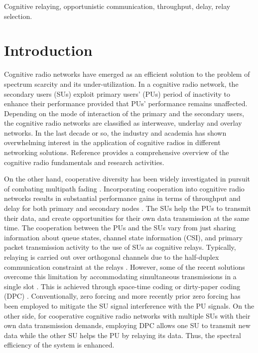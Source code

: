 \documentclass[journal,twocolumn]{IEEEtran}
\begin{document}
\begin{IEEEkeywords}
Cognitive relaying, opportunistic communication, throughput, delay, relay selection.
\end{IEEEkeywords}



\section{Introduction}
Cognitive radio networks have emerged as an efficient solution to the problem of spectrum scarcity and its under-utilization. In a cognitive radio network, the secondary users (SUs) exploit primary users' (PUs) period of inactivity to enhance their performance provided that PUs' performance remains unaffected. Depending on the mode of interaction of the primary and the secondary users, the cognitive radio networks are classified as interweave, underlay and overlay networks. In the last decade or so, the industry and academia has shown overwhelming interest in the application of cognitive radios in different networking solutions. Reference \cite{haykin2005cognitive} provides a comprehensive overview of the cognitive radio fundamentals and research activities.

On the other hand, cooperative diversity has been widely investigated in pursuit of combating multipath fading \cite{Tse,Kramer}. Incorporating cooperation into cognitive radio networks results in substantial performance gains in terms of throughput and delay for both primary and
secondary nodes \cite{Ephremedis}. The SUs help the PUs to transmit their data, and create opportunities for their own data transmission at the same time. The cooperation between the PUs and the SUs vary from just sharing information about queue states, channel state information (CSI), and primary packet transmission activity to the use of SUs as cognitive relays.
Typically, relaying is carried out over orthogonal channels due to the half-duplex communication constraint at the relays \cite{Tse}. However, some of the recent solutions overcome this limitation by accommodating simultaneous transmissions in a single slot \cite{Gamal,Krikidis,Krikidis2}. This is achieved through space-time coding \cite{Gamal} or dirty-paper coding (DPC) \cite{Krikidis,Krikidis2}. Conventionally, zero forcing and more recently prior zero forcing \cite{Song:2013} has been employed to mitigate the SU signal interference with the PU signals. On the other side, for cooperative cognitive radio networks with multiple SUs with their own data transmission demands, employing DPC allows one SU to transmit new data while the other SU helps the PU by relaying its data. Thus, the spectral efficiency of the system is enhanced.
\end{document}
